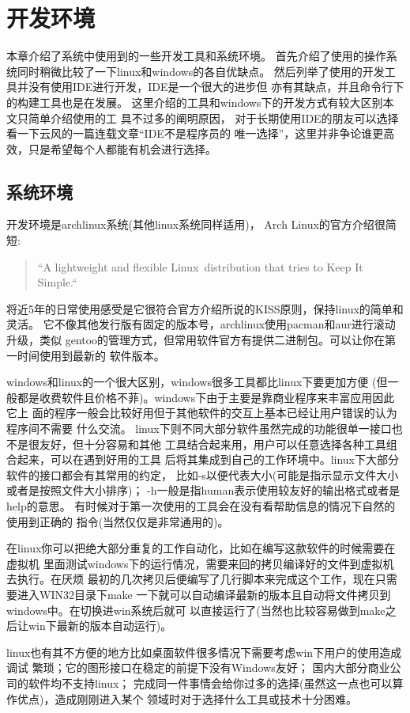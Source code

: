 \chapter{开发环境}
本章介绍了系统中使用到的一些开发工具和系统环境。
首先介绍了使用的操作系统同时稍微比较了一下linux和windows的各自优缺点。
然后列举了使用的开发工具并没有使用IDE进行开发，IDE是一个很大的进步但
亦有其缺点，并且命令行下的构建工具也是在发展。
这里介绍的工具和windows下的开发方式有较大区别本文只简单介绍使用的工
具不过多的阐明原因，
对于长期使用IDE的朋友可以选择看一下云风的一篇连载文章``IDE不是程序员的
唯一选择''，这里并非争论谁更高效，只是希望每个人都能有机会进行选择。

\section{系统环境}
开发环境是archlinux系统(其他linux系统同样适用)，
Arch Linux的官方介绍很简短:
\begin{quote}
``A lightweight and flexible Linux\textregistered \ distribution that tries to
Keep It Simple.``
\end{quote}
将近5年的日常使用感受是它很符合官方介绍所说的KISS原则，保持linux的简单和灵活。
它不像其他发行版有固定的版本号，archlinux使用pacman和aur进行滚动升级，类似
gentoo的管理方式，但常用软件官方有提供二进制包。可以让你在第一时间使用到最新的
软件版本。

windows和linux的一个很大区别，windows很多工具都比linux下要更加方便
(但一般都是收费软件且价格不菲)。windows下由于主要是靠商业程序来丰富应用因此它上
面的程序一般会比较好用但于其他软件的交互上基本已经让用户错误的认为程序间不需要
什么交流。
linux下则不同大部分软件虽然完成的功能很单一接口也不是很友好，但十分容易和其他
工具结合起来用，用户可以任意选择各种工具组合起来，可以在遇到好用的工具
后将其集成到自己的工作环境中。linux下大部分软件的接口都会有其常用的约定，
比如-s以便代表大小(可能是指示显示文件大小或者是按照文件大小排序)；
-h一般是指human表示使用较友好的输出格式或者是help的意思。
有时候对于第一次使用的工具会在没有看帮助信息的情况下自然的使用到正确的
指令(当然仅仅是非常通用的)。

在linux你可以把绝大部分重复的工作自动化，比如在编写这款软件的时候需要在虚拟机
里面测试windows下的运行情况，需要来回的拷贝编译好的文件到虚拟机去执行。在厌烦
最初的几次拷贝后便编写了几行脚本来完成这个工作，现在只需要进入WIN32目录下make
一下就可以自动编译最新的版本且自动将文件拷贝到windows中。在切换进win系统后就可
以直接运行了(当然也比较容易做到make之后让win下最新的版本自动运行)。

linux也有其不方便的地方比如桌面软件很多情况下需要考虑win下用户的使用造成调试
繁琐；它的图形接口在稳定的前提下没有Windows友好； 
国内大部分商业公司的软件均不支持linux；
完成同一件事情会给你过多的选择(虽然这一点也可以算作优点)，造成刚刚进入某个
领域时对于选择什么工具或技术十分困难。


